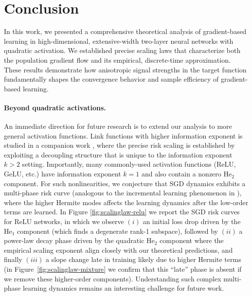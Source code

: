 \section{Conclusion}
\label{sec:concl}



 

In this work, we presented a comprehensive theoretical analysis of gradient-based learning in high-dimensional, extensive-width two-layer neural networks with quadratic activation.  We established precise scaling
laws that characterize both the population gradient flow and its empirical, discrete-time approximation.
These results demonstrate how anisotropic signal strengths in the target function fundamentally shapes the
convergence behavior and sample efficiency of gradient-based learning. 

\paragraph{Beyond quadratic activations.} 
An immediate direction for future research is to extend our analysis to more general activation functions. Link functions with higher information exponent is studied in a companion work \cite{ren2025emergence}, where the precise risk scaling is established by exploiting a decoupling structure that is unique to the information exponent $k>2$ setting. 
Importantly, many commonly-used activation functions (ReLU, GeLU, etc.) have information exponent $k=1$ and also contain a nonzero $\mathrm{He}_2$ component. For such nonlinearities, we conjecture that SGD dynamics exhibits a multi-phase risk curve (analogous to the incremental learning phenomenon in \cite{abbe2023sgd,bietti2023learning}), where the higher Hermite modes affects the learning dynamics after the low-order terms are learned. In Figure \ref{fig:scalinglaw-relu} we report the SGD risk curves for ReLU networks, in which we observe $(i)$ an initial loss drop driven by the $\mathrm{He}_1$ component (which finds a degenerate rank-1 subspace), followed by $(ii)$ a power-law decay phase driven by the quadratic $\mathrm{He}_2$ component where the empirical scaling exponent align closely with our theoretical predictions, and finally $(iii)$ a slope change late in training likely due to higher Hermite terms (in Figure~\ref{fig:scalinglaw-mixture} we confirm that this ``late'' phase is absent if we remove these higher-order components). Understanding such complex multi-phase learning dynamics remains an interesting challenge for future work. 

